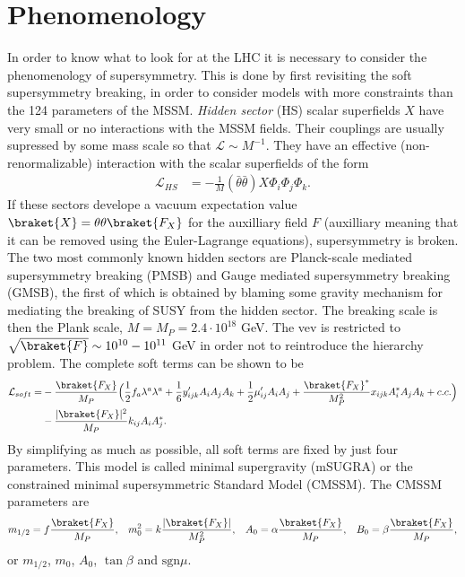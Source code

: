 \documentclass[twoside,english]{uiofysmaster}
\begin{document}
\section{Phenomenology}
In order to know what to look for at the LHC it is necessary to consider the phenomenology of supersymmetry. This is done by first revisiting the soft supersymmetry breaking, in order to consider models with more constraints than the 124 parameters of the MSSM. \textit{Hidden sector} (HS) scalar superfields $X$ have very small or no interactions with the MSSM fields. Their couplings are usually supressed by some mass scale so that $\mathcal{L} \sim M^{-1}$. They have an effective (non-renormalizable) interaction  with the scalar superfields of the form
\begin{align}
\mathcal{L}_{HS} &= - \frac{1}{M} (\bar{\theta} \bar{\theta}) X \Phi_i \Phi_j \Phi_k.
\end{align}
If these sectors develope a vacuum expectation value $\braket{X} = \theta \theta\braket{F_X}$ for the auxilliary field $F$ (auxilliary meaning that it can be removed using the Euler-Lagrange equations),  supersymmetry is broken. The two most commonly known hidden sectors are Planck-scale mediated supersymmetry breaking (PMSB) and Gauge mediated supersymmetry breaking (GMSB), the first of which is obtained by blaming some gravity mechanism for mediating the breaking of SUSY from the hidden sector. The breaking scale is then the Plank scale, $M = M_P = 2.4 \cdot 10^{18}$ GeV. The vev is restricted to $\sqrt{\braket{F}} \sim 10^{10} - 10^{11}$ GeV in order not to reintroduce the hierarchy problem.  The complete soft terms can be shown to be \cite{batzing2017lecture}
\begin{align*}
\mathcal{L}_{soft} =& - \frac{\braket{F_X}}{M_P} \Big( \frac{1}{2} f_a \lambda^a \lambda^a + \frac{1}{6} y_{ijk}'A_i A_j A_k + \frac{1}{2} \mu_{ij}' A_i A_j + \frac{\braket{F_X}^*}{M_P^2}  x_{ijk} A_i^* A_j A_k + c.c.\Big)\\
&- \frac{|\braket{F_X}|^2}{M_P} k_{ij}A_i A_j^*.
\end{align*}
By simplifying as much as possible, all soft terms are fixed by just four parameters. This model is called minimal supergravity (mSUGRA) or the constrained minimal supersymmetric Standard Model (CMSSM). The CMSSM parameters are
\begin{align}
&m_{1/2} = f \frac{\braket{F_X}}{M_P}, & m_0^2 = k \frac{|\braket{F_X}|}{M_P^2}, 
&& A_0 = \alpha \frac{\braket{F_X}}{M_P}, &&B_0 = \beta \frac{\braket{F_X}}{M_P},
\end{align}
or $m_{1/2}$, $m_0$, $A_0$, $\tan \beta$ and $\text{sgn} \mu$.
\end{document}
